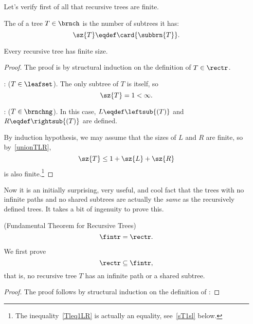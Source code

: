 \begin{definition}
Let's verify first of all that recursive trees are finite.
\begin{definition}
The   of a tree $T \in \brnch$ is the
number of subtrees it has:
\begin{equation}\label{treesizedef}
\sz{T} \eqdef \card{\subbrn{T}}.
\end{equation}
\end{definition}

\begin{corollary}\label{cor:finitetree}
Every recursive tree has finite size.

\begin{proof}
The proof is by structural induction on the definition of $T \in
\rectr$.

: ($T \in \leafset$).  The only subtree of $T$
is itself, so
\[
\sz{T} = 1 < \infty.
\]

: ($T \in \brnchng$).  In this case,
$L \eqdef \leftsub{(T)}$ and $R \eqdef \rightsub{(T)}$ are defined.

By induction hypothesis, we may assume that the sizes of $L$ and $R$
are finite, so by~\eqref{unionTLR},
\begin{equation}\label{Tleq1LR}
\sz{T} \leq 1 + \sz{L} + \sz{R}
\end{equation}
is also finite.\footnote{The inequality~\eqref{Tleq1LR} is actually an
  equality, see~\eqref{sT1sl} below.}
\end{proof}
\end{corollary}

Now it is an initially surprising, very useful, and cool fact that the
trees with no infinite paths and no shared subtrees are actually the
\emph{same} as the recursively defined trees.  It takes a bit of
ingenuity to prove this.

\begin{theorem}\label{fundthmrec}(Fundamental Theorem for Recursive Trees)
\[
\fintr = \rectr.
\]
\end{theorem}

We first prove
\begin{equation}\label{rectrsubfintr}
\rectr \subseteq \fintr,
\end{equation}
that is, no recursive tree $T$ has an infinite path or a shared subtree.

\begin{proof}
The proof follows by structural induction on the
definition of \rectr:


\end{proof}
\end{definition}
